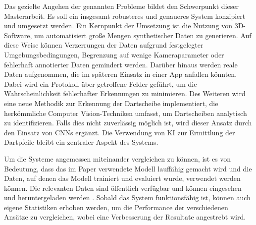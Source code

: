 Das gezielte Angehen der genannten Probleme bildet den Schwerpunkt dieser Masterarbeit. Es soll ein insgesamt robusteres und genaueres System konzipiert und umgesetzt werden. Ein Kernpunkt der Umsetzung ist die Nutzung von 3D-Software, um automatisiert große Mengen synthetischer Daten zu generieren. Auf diese Weise können Verzerrungen der Daten aufgrund festgelegter Umgebungsbedingungen, Begrenzung auf wenige Kameraparameter oder fehlerhaft annotierter Daten gemindert werden. Darüber hinaus werden reale Daten aufgenommen, die im späteren Einsatz in einer App anfallen könnten. Dabei wird ein Protokoll über getroffene Felder geführt, um die Wahrscheinlichkeit fehlerhafter Erkennungen zu minimieren. Des Weiteren wird eine neue Methodik zur Erkennung der Dartscheibe implementiert, die herkömmliche Computer Vision-Techniken umfasst, um Dartscheiben analytisch zu identifizieren. Falls dies nicht zuverlässig möglich ist, wird dieser Ansatz durch den Einsatz von CNNs ergänzt. Die Verwendung von KI zur Ermittlung der Dartpfeile bleibt ein zentraler Aspekt des Systems.

Um die Systeme angemessen miteinander vergleichen zu können, ist es von Bedeutung, dass das im Paper verwendete Modell lauffähig gemacht wird und die Daten, auf denen das Modell trainiert und evaluiert wurde, verwendet werden können. Die relevanten Daten sind öffentlich verfügbar und können eingesehen und heruntergeladen werden \cite{deepdarts-data}. Sobald das System funktionsfähig ist, können auch eigene Statistiken erhoben werden, um die Performance der verschiedenen Ansätze zu vergleichen, wobei eine Verbesserung der Resultate angestrebt wird.

\iffalse

